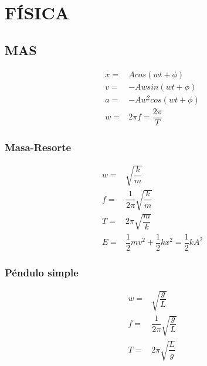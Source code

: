 \section{FÍSICA}

\subsection{MAS}

\begin{align*}
	x=&Acos(wt+\phi)\\
	v=&-Awsin(wt+\phi)\\
	a=&-Aw^2cos(wt+\phi)\\
	w=&2\pi f=\dfrac{2\pi}{T}
\end{align*}

\subsubsection{Masa-Resorte}
\begin{align*}
	w=&\sqrt{\dfrac{k}{m}}\\
	f=&\dfrac{1}{2\pi}\sqrt{\dfrac{k}{m}}\\
	T=&2\pi\sqrt{\dfrac{m}{k}}\\
	E=&\dfrac{1}{2}mv^2+\dfrac{1}{2}kx^2=\dfrac{1}{2}kA^2
\end{align*}

\subsubsection{Péndulo simple}
\begin{align*}
	w=&\sqrt{\dfrac{g}{L}}\\
	f=&\dfrac{1}{2\pi}\sqrt{\dfrac{g}{L}}\\
	T=&2\pi\sqrt{\dfrac{L}{g}}
\end{align*}